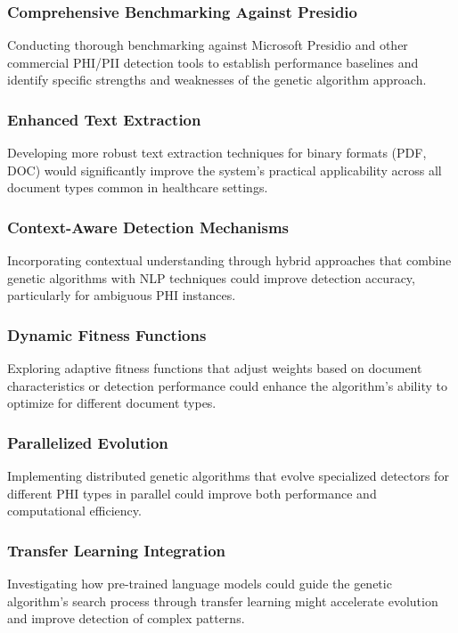 \documentclass[conference]{IEEEtran}
\begin{document}
\subsubsection{Comprehensive Benchmarking Against Presidio} Conducting thorough benchmarking against Microsoft Presidio and other commercial PHI/PII detection tools to establish performance baselines and identify specific strengths and weaknesses of the genetic algorithm approach.

\subsubsection{Enhanced Text Extraction} Developing more robust text extraction techniques for binary formats (PDF, DOC) would significantly improve the system's practical applicability across all document types common in healthcare settings.

\subsubsection{Context-Aware Detection Mechanisms} Incorporating contextual understanding through hybrid approaches that combine genetic algorithms with NLP techniques could improve detection accuracy, particularly for ambiguous PHI instances.

\subsubsection{Dynamic Fitness Functions} Exploring adaptive fitness functions that adjust weights based on document characteristics or detection performance could enhance the algorithm's ability to optimize for different document types.

\subsubsection{Parallelized Evolution} Implementing distributed genetic algorithms that evolve specialized detectors for different PHI types in parallel could improve both performance and computational efficiency.

\subsubsection{Transfer Learning Integration} Investigating how pre-trained language models could guide the genetic algorithm's search process through transfer learning might accelerate evolution and improve detection of complex patterns.
\end{document}
